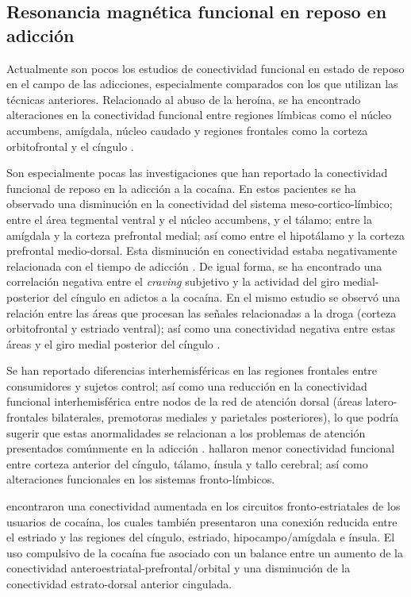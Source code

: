 \subsection{Resonancia magnética funcional en reposo en adicción}
Actualmente son pocos los estudios de conectividad funcional en estado de reposo en el campo de las adicciones, especialmente comparados con los que utilizan las técnicas anteriores.
Relacionado al abuso de la heroína, se ha encontrado alteraciones en la conectividad funcional entre regiones límbicas \textemdash{}como el núcleo accumbens, amígdala, núcleo caudado\textemdash{} y regiones frontales \textemdash{}como la corteza orbitofrontal y el cíngulo \parencite{Ma2010,Tianye2015,Wang2010,Zhang2016}.\par
Son especialmente pocas las investigaciones que han reportado la conectividad funcional de reposo en la adicción a la cocaína.
En estos pacientes se ha observado una disminución en la conectividad del sistema meso-cortico-límbico; entre el área tegmental ventral y el núcleo accumbens, y el tálamo; entre la amígdala y la corteza prefrontal medial; así como entre el hipotálamo y la corteza prefrontal medio-dorsal.
Esta disminución en conectividad estaba negativamente relacionada con el tiempo de adicción \parencite{Gu2010}.
De igual forma, se ha encontrado una correlación negativa entre el \textit{craving} subjetivo y la actividad del giro medial-posterior del cíngulo en adictos a la cocaína.
En el mismo estudio se observó una relación entre las áreas que procesan las señales relacionadas a la droga (corteza orbitofrontal y estriado ventral);
así como una conectividad negativa entre estas áreas y el giro medial posterior del cíngulo \parencite{Wilcox2011}.\par
Se han reportado diferencias interhemisféricas en las regiones frontales entre consumidores y sujetos control;
así como una reducción en la conectividad funcional interhemisférica entre nodos de la red de atención dorsal (áreas latero-frontales bilaterales, premotoras mediales y parietales posteriores), lo que podría sugerir que estas anormalidades se relacionan a los problemas de atención presentados comúnmente en la adicción \parencite{Kelly2011a}.
\textcite{Verdejo-Garcia2014} hallaron menor conectividad funcional entre corteza anterior del cíngulo, tálamo, ínsula y tallo cerebral; así como alteraciones funcionales en los sistemas fronto-límbicos.\par
\textcite{Hu2015} encontraron una conectividad aumentada en los circuitos fronto-estriatales de los usuarios de cocaína, los cuales también presentaron una conexión reducida entre el estriado y las regiones del cíngulo, estriado, hipocampo/amígdala e ínsula. El uso compulsivo de la cocaína fue asociado con un balance entre un aumento de la conectividad anteroestriatal-prefrontal/orbital y una disminución de la conectividad estrato-dorsal anterior cingulada.\par
